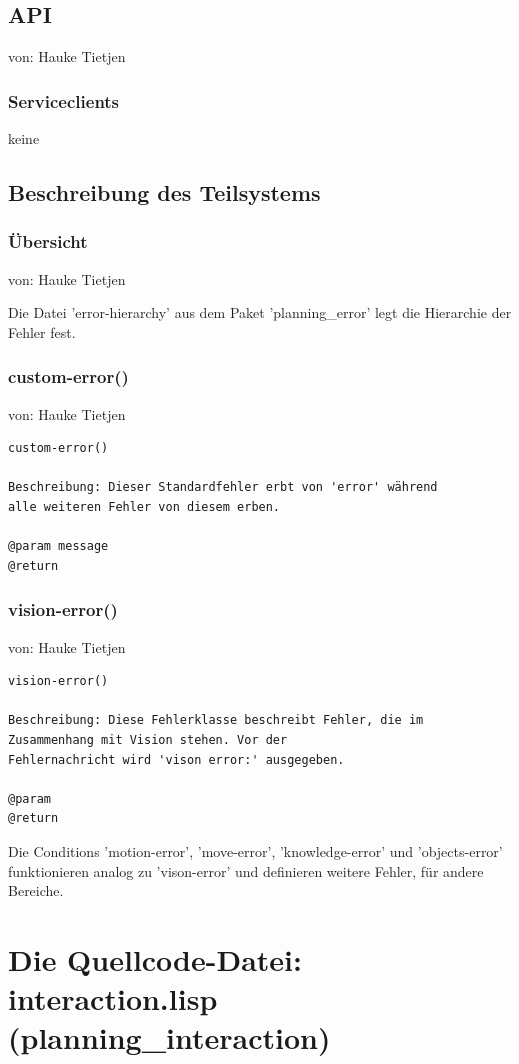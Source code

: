\documentclass{suturo}
\makeatletter
\newcommand{\chapterauthor}[1]{%
  {\parindent0pt\vspace*{-27pt}%
  \linespread{0}\small\begin{flushright}von: #1\end{flushright}%
  \par\nobreak\vspace*{0pt}}
  \@afterheading%
}
\makeatother
\begin{document}
\subsection{API}
\chapterauthor{Hauke Tietjen}
\subsubsection{Serviceclients}
keine
\subsection{Beschreibung des Teilsystems}
\subsubsection{\"Ubersicht}
\chapterauthor{Hauke Tietjen}
Die Datei 'error-hierarchy' aus dem Paket 'planning\_error' legt die Hierarchie der Fehler fest.

\subsubsection{custom-error()}
\chapterauthor{Hauke Tietjen}
\begin{verbatim}
custom-error()

Beschreibung: Dieser Standardfehler erbt von 'error' während
alle weiteren Fehler von diesem erben. 

@param message
@return 
\end{verbatim}

\subsubsection{vision-error()}
\chapterauthor{Hauke Tietjen}
\begin{verbatim}
vision-error()

Beschreibung: Diese Fehlerklasse beschreibt Fehler, die im
Zusammenhang mit Vision stehen. Vor der 
Fehlernachricht wird 'vison error:' ausgegeben. 

@param
@return 
\end{verbatim}

Die Conditions 'motion-error', 'move-error', 'knowledge-error' und 'objects-error' funktionieren analog zu 'vison-error' und definieren weitere Fehler, für andere Bereiche.
\newpage
\section{Die Quellcode-Datei: interaction.lisp (planning\_interaction)}
\end{document}
